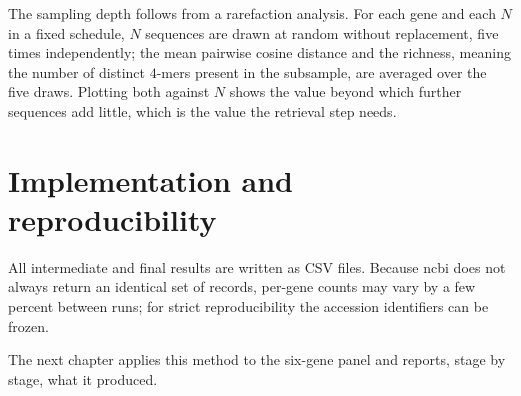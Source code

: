 The sampling depth follows from a rarefaction analysis. For each gene and each $N$ in a fixed
schedule, $N$ sequences are drawn at random without replacement, five times independently; the
mean pairwise cosine distance and the richness, meaning the number of distinct $4$-mers present in
the subsample, are averaged over the five draws. Plotting both against $N$ shows the value beyond
which further sequences add little, which is the value the retrieval step needs.

\section{Implementation and reproducibility}

All intermediate and final results are written as CSV files. Because \acrshort{ncbi} does not always return
an identical set of records, per-gene counts may vary by a few percent between runs; for strict
reproducibility the accession identifiers can be frozen.

The next chapter applies this method to the six-gene panel and reports, stage by stage, what it
produced.
